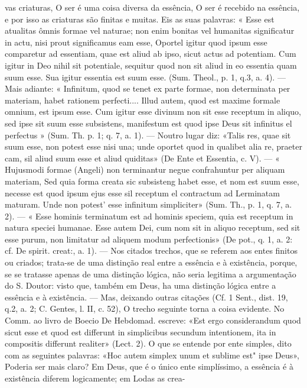 \documentclass[12pt,a4paper]{article}
\begin{document}
{{{{{{{{{{{{{{{{{vas criaturas, O ser é uma coisa diversa da essência, O ser é recebido na
essência, e por isso as criaturas são finitas e muitas. Eis as suas palavras: « Esse est atualitas ômnis formae vel naturae; non enim bonitas vel
humanitas significatur in actu, nisi prout significamus eam esse, Oportel
 igitur quod ipsum esse comparetur ad essentiam, quae est aliud ab ipso,
 sicut actus ad potentiam. Cum igitur in Deo nihil sit potentiale, sequitur
 quod non sit aliud in eo essentia quam suum esse. Sua igitur essentia est
suum esse. (Sum. Theol., p. 1, q.3, a. 4). — Mais adiante: « Infinitum, quod
 se tenet ex parte formae, non determinata per materiam, habet rationem
 perfecti.... Illud autem, quod est maxime formale omnium, est ipsum esse.
 Cum igitur esse divinum non sit esse receptum in aliquo, sed ipse sit suum
esse subsistens, manifestum est quod ipse Deus sit infinitus el perfectus
 »
 (Sum. Th. p. 1; q. 7, a. 1). — Noutro lugar diz: «Talis res, quae sit suum
esse, non potest esse nisi una; unde oportet quod in qualibet alia re, praeter
cam, sil aliud suum esse et aliud quiditas» (De Ente et Essentia, c. V). —
 « Hujusmodi formae (Angeli) non terminantur negue confrahuntur per aliquam materiam, Sed quia forma creata sic subsisteng habet esse, et nom est
suum esse, necesse est quod ipsum ejus esse sil receptum el contractum ad
 Lerminatam maturam. Unde non potest' esse infinitum simpliciter» (Sum.
 Th., p. 1, q. 7, a. 2). — « Esse hominis terminatum est ad hominis speciem,
quia est receptum in natura speciei humanae. Esse autem Dei, cum nom sit
in aliquo receptum, sed sit esse purum, non limitatur ad aliquem modum
perfectionis» (De pot., q. 1, a. 2: cf. De spirit. creat:, a. 1). — Nos citados
 trechos, que se referem aos entes finitos ou criados; trata-se de uma distinção real entre a essência e à existência, porque, se se tratasse apenas de
uma distinção lógica, não seria legitima a argumentação do S. Doutor:
visto que, também em Deus, ha uma distinção lógica entre a essência e à
existência. — Mas, deixando outras citações (Cf. 1 Sent., dist. 19, q.2, a. 2;
 C. Gentes, l. II, c. 52), O trecho seguinte torna a coisa evidente. No Comm.
ao livro de Boecio De Hebdomad. escreve: «Est ergo considerandum quod
sicut esse et quod est differunt in simplicibus secundum intentionem, ita in
compositis differunt realiter» (Lect. 2). O que se entende por ente simples,
dito com as seguintes palavras: «Hoc autem simplex unum et sublime est"
 ipse Deus», Poderia ser mais claro? Em Deus, que é o único ente simplíssimo, a essência é à existência diferem logicamente; em Lodas as crea-
}}}}}}}}}}}}}}}}}
\end{document}
